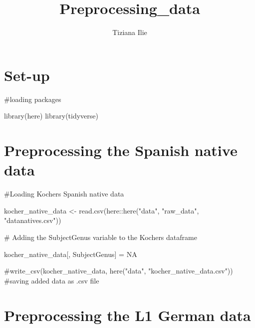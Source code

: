 \documentclass[
  letterpaper,
  DIV=11,
  numbers=noendperiod]{scrartcl}
\title{Preprocessing\_data}
\author{Tiziana Ilie}
\date{}
\newenvironment{Shaded}{\begin{snugshade}}{\end{snugshade}}
\newcommand{\CommentTok}[1]{\textcolor[rgb]{0.37,0.37,0.37}{#1}}
\newcommand{\ConstantTok}[1]{\textcolor[rgb]{0.56,0.35,0.01}{#1}}
\newcommand{\FunctionTok}[1]{\textcolor[rgb]{0.28,0.35,0.67}{#1}}
\newcommand{\NormalTok}[1]{\textcolor[rgb]{0.00,0.23,0.31}{#1}}
\newcommand{\OtherTok}[1]{\textcolor[rgb]{0.00,0.23,0.31}{#1}}
\newcommand{\SpecialCharTok}[1]{\textcolor[rgb]{0.37,0.37,0.37}{#1}}
\newcommand{\StringTok}[1]{\textcolor[rgb]{0.13,0.47,0.30}{#1}}
\begin{document}
\maketitle


\section{Set-up}\label{set-up}

\begin{Shaded}
\begin{Highlighting}[]
\CommentTok{\#loading packages}

\FunctionTok{library}\NormalTok{(here)}
\FunctionTok{library}\NormalTok{(tidyverse)}
\end{Highlighting}
\end{Shaded}

\section{Preprocessing the Spanish native
data}\label{preprocessing-the-spanish-native-data}

\begin{Shaded}
\begin{Highlighting}[]
\CommentTok{\#Loading Kocher\textquotesingle{}s Spanish native data}

\NormalTok{kocher\_native\_data }\OtherTok{\textless{}{-}} \FunctionTok{read.csv}\NormalTok{(here}\SpecialCharTok{::}\FunctionTok{here}\NormalTok{(}\StringTok{"data"}\NormalTok{, }\StringTok{"raw\_data"}\NormalTok{, }\StringTok{"datanatives.csv"}\NormalTok{))}

\CommentTok{\# Adding the \textquotesingle{}SubjectGenus\textquotesingle{} variable to the Kocher\textquotesingle{}s dataframe}

\NormalTok{kocher\_native\_data[, }\StringTok{\textquotesingle{}SubjectGenus\textquotesingle{}}\NormalTok{] }\OtherTok{=} \ConstantTok{NA}

\CommentTok{\#write\_csv(kocher\_native\_data, here("data", "kocher\_native\_data.csv")) \#saving added data as .csv file}
\end{Highlighting}
\end{Shaded}

\section{Preprocessing the L1 German
data}\label{preprocessing-the-l1-german-data}
\end{document}
